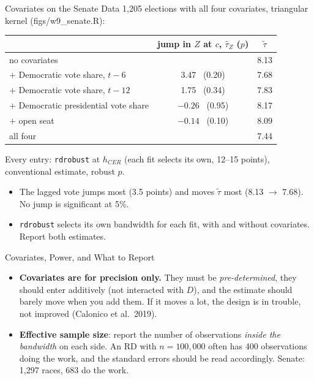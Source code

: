 \documentclass[aspectratio=169,11pt,xcolor=dvipsnames]{beamer}
\newcommand{\srcp}[1]{{\scriptsize\color{gray}(#1)}}
\begin{document}
\begin{frame}{Covariates on the Senate Data}
1,205 elections with all four covariates, triangular kernel \srcp{figs/w9\_senate.R}:
\begin{center}\footnotesize
\renewcommand{\arraystretch}{1.0}
\begin{tabular}{@{}lcc@{}}
\toprule
& jump in $Z$ at $c$, $\hat\tau_Z$ ($p$) & $\tilde\tau$ \\
\midrule
no covariates & & 8.13 \\
\midrule
$+$ Democratic vote share, $t-6$ & \phantom{$-$}3.47 \ (0.20) & 7.68 \\
$+$ Democratic vote share, $t-12$ & \phantom{$-$}1.75 \ (0.34) & 7.83 \\
$+$ Democratic presidential vote share & $-0.26$ \ (0.95) & 8.17 \\
$+$ open seat & $-0.14$ \ (0.10) & 8.09 \\
\midrule
all four & & 7.44 \\
\bottomrule
\end{tabular}
\end{center}
\vskip-4pt
{\footnotesize Every entry: \texttt{rdrobust} at $h_{CER}$ (each fit selects its own, 12--15 points),
conventional estimate, robust $p$.}
\vskip2pt
\begin{itemize}\itemsep2pt
  \item The lagged vote jumps most (3.5 points) and moves $\tilde\tau$ most (8.13 $\to$ 7.68).
        No jump is significant at 5\%.
  \item \texttt{rdrobust} selects its own bandwidth for each fit, with and
        without covariates. Report both estimates.
\end{itemize}
\end{frame}

\begin{frame}{Covariates, Power, and What to Report}
\begin{itemize}\itemsep4pt
  \item \textbf{Covariates are for precision only.} They must be
        \emph{pre-determined}, they should enter additively (not interacted with
        $D$), and the estimate should barely move when you add them. If it moves
        a lot, the design is in trouble, not improved
        \srcp{Calonico et al.\ 2019}.
  \item \textbf{Effective sample size}: report the number of observations
        \emph{inside the bandwidth} on each side. An RD with $n = 100{,}000$ often
        has 400 observations doing the work, and the standard errors should be
        read accordingly. Senate: 1,297 races, 683 do the work.
\end{itemize}
\end{frame}
\end{document}

